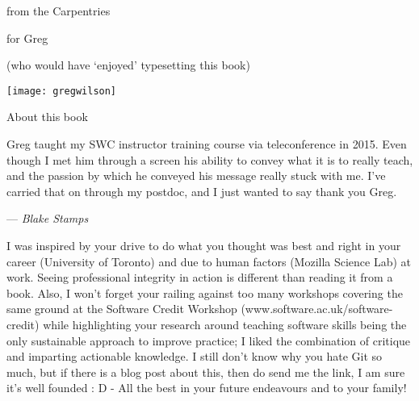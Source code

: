 %
%
% 
%
\newcommand{\signed}[1]{\par\hfill\normalfont--- \textit{#1}}

\newpage

\vspace*{1in}
\begin{center}
{\Large from the Carpentries} 

{\LARGE for Greg}

{\large (who would have `enjoyed' typesetting this book)}

\vspace*{0.5in}

\texttt{[image: gregwilson]}
\end{center}
\newpage

\vspace*{1in}
{\LARGE About this book}


\newpage

Greg taught my SWC instructor training course via teleconference in 2015. Even
though I met him through a screen his ability to convey what it is to really
teach, and the passion by which he conveyed his message really stuck with me.
I've carried that on through my postdoc, and I just wanted to say thank you
Greg.

\signed{Blake Stamps}

\newpage

I was inspired by your drive to do what you thought was best and right in your
career (University of Toronto) and due to human factors (Mozilla Science Lab)
at work. Seeing professional integrity in action is different than reading it
from a book. Also, I won't forget your railing against too many workshops
covering the same ground at the Software Credit Workshop
(www.software.ac.uk/software-credit) while highlighting your research around
teaching software skills being the only sustainable approach to improve
practice; I liked the combination of critique and imparting actionable
knowledge. I still don't know why you hate Git so much, but if there is a blog
post about this, then do send me the link, I am sure it's well founded  :  D  -
All the best in your future endeavours and to your family! 

